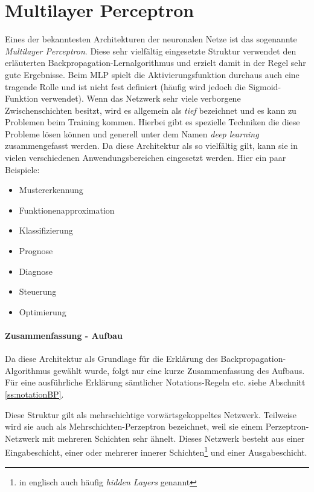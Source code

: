 \section{Multilayer Perceptron}

Eines der bekanntesten Architekturen der neuronalen Netze ist das sogenannte \emph{Multilayer Perceptron}. Diese sehr vielfältig eingesetzte Struktur verwendet den erläuterten Backpropagation-Lernalgorithmus und erzielt damit in der Regel sehr gute Ergebnisse. Beim MLP spielt die Aktivierungsfunktion durchaus auch eine tragende Rolle und ist nicht fest definiert (häufig wird jedoch die Sigmoid-Funktion verwendet). Wenn das Netzwerk sehr viele verborgene Zwischenschichten besitzt, wird es allgemein als \emph{tief} bezeichnet und es kann zu Problemen beim Training kommen. Hierbei gibt es spezielle Techniken die diese Probleme lösen können und generell unter dem Namen \emph{deep learning} zusammengefasst werden. Da diese Architektur als so vielfältig gilt, kann sie in vielen verschiedenen Anwendungsbereichen eingesetzt werden. Hier ein paar Beispiele:

\begin{multicols}{2}
\begin{itemize}
\item Mustererkennung
\item Funktionenapproximation
\item Klassifizierung
\item Prognose
\item Diagnose
\item Steuerung
\item Optimierung
\end{itemize}
\end{multicols}

\paragraph{Zusammenfassung - Aufbau}

Da diese Architektur als Grundlage für die Erklärung des Backpropagation-Algorithmus gewählt wurde, folgt nur eine kurze Zusammenfassung des Aufbaus. Für eine ausführliche Erklärung sämtlicher Notations-Regeln etc. siehe Abschnitt \ref{ss:notationBP}.

Diese Struktur gilt als mehrschichtige vorwärtsgekoppeltes Netzwerk. Teilweise wird sie auch als Mehrschichten-Perzeptron bezeichnet, weil sie einem Perzeptron-Netzwerk mit mehreren Schichten sehr ähnelt. Dieses Netzwerk besteht aus einer Eingabeschicht, einer oder mehrerer innerer Schichten\footnote{in englisch auch häufig \emph{hidden Layers} genannt} und einer Ausgabeschicht. 

